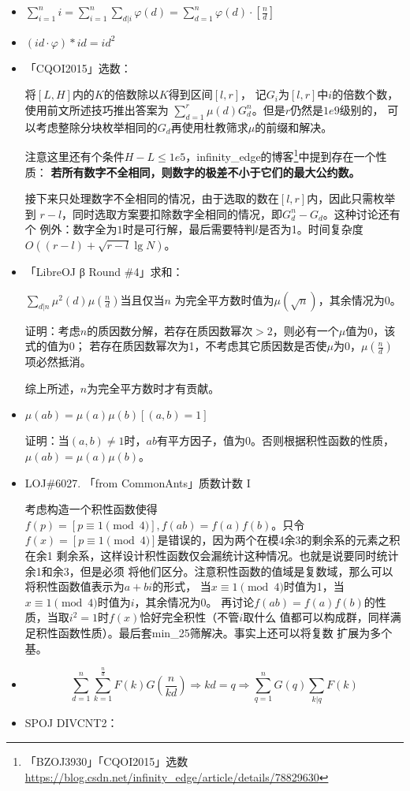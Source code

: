 \begin{itemize}
	\item $\displaystyle \sum_{i=1}^n{i}=
		      \sum_{i=1}^n{\sum_{d|i}\varphi(d)}=
		      \sum_{d=1}^n{\varphi(d)\cdot[\frac{n}{d}]}$
	\item $(id\cdot\varphi)*id=id^2$
	\item 「CQOI2015」选数：

	将$[L,H]$内的$K$的倍数除以$K$得到区间$[l,r]$，
	记$G_i$为$[l,r]$中$i$的倍数个数，使用前文所述技巧推出答案为
	$\displaystyle \sum_{d=1}^r{\mu(d)G_d^n}$。但是$r$仍然是$1e9$级别的，
	可以考虑整除分块枚举相同的$G_d$再使用杜教筛求$\mu$的前缀和解决。

	注意这里还有个条件$H-L\leq 1e5$，infinity\_edge的博客\footnote{
		「BZOJ3930」「CQOI2015」选数
		\url{https://blog.csdn.net/infinity\_edge/article/details/78829630}
	}中提到存在一个性质：
	{\bfseries 若所有数字不全相同，则数字的极差不小于它们的最大公约数。}

	接下来只处理数字不全相同的情况，由于选取的数在$[l,r]$内，因此只需枚举到
	$r-l$，同时选取方案要扣除数字全相同的情况，即$G_d^n-G_d$。这种讨论还有个
	例外：数字全为$1$时是可行解，最后需要特判$l$是否为1。时间复杂度
	$O((r-l)+\sqrt{r-l}\lg N)$。

	\item 「LibreOJ β Round \#4」求和：

	$\displaystyle \sum_{d|n}{\mu^2(d)\mu(\frac{n}{d})}$当且仅当$n$
	为完全平方数时值为$\mu(\sqrt{n})$，其余情况为0。

	证明：考虑$n$的质因数分解，若存在质因数幂次$>2$，则必有一个$\mu$值为0，该式的值为0；
	若存在质因数幂次为1，不考虑其它质因数是否使$\mu$为0，$\mu(\frac{n}{d})$项必然抵消。

	综上所述，$n$为完全平方数时才有贡献。
	\item $\mu(ab)=\mu(a)\mu(b)[(a,b)=1]$

	证明：当$(a,b)\neq 1$时，$ab$有平方因子，值为0。否则根据积性函数的性质，
	$\mu(ab)=\mu(a)\mu(b)$。
	\item LOJ\#6027. 「from CommonAnts」质数计数 I

	考虑构造一个积性函数使得$f(p)=[p\equiv 1\pmod{4}],f(ab)=f(a)f(b)$。只令
	$f(x)=[p\equiv 1\pmod{4}]$是错误的，因为两个在模4余3的剩余系的元素之积在余1
	剩余系，这样设计积性函数仅会漏统计这种情况。也就是说要同时统计余1和余3，但是必须
	将他们区分。注意积性函数的值域是复数域，那么可以将积性函数值表示为$a+bi$的形式，
	当$x\equiv 1\pmod{4}$时值为1，当$x\equiv 1\pmod{4}$时值为$i$，其余情况为0。
	再讨论$f(ab)=f(a)f(b)$的性质，当取$i^2=1$时$f(x)$恰好完全积性（不管$i$取什么
	值都可以构成群，同样满足积性函数性质）。最后套min\_25筛解决。事实上还可以将复数
	扩展为多个基。
	\item
	\begin{displaymath}
		\sum_{d=1}^n{\sum_{k=1}^{\frac{n}{d}}{F(k)G(\frac{n}{kd})}}\Rightarrow kd=q \Rightarrow \sum_{q=1}^n{G(q)\sum_{k|q}F(k)}
	\end{displaymath}
	\item SPOJ DIVCNT2：


\end{itemize}
